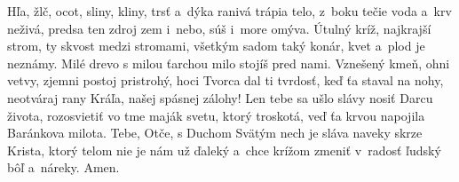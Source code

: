 Hľa, žlč, ocot, sliny, kliny,
trsť a~dýka ranivá
trápia telo, z~boku tečie
voda a~krv neživá,
predsa ten zdroj zem i~nebo,
súš i~more omýva.
\versseparator
Útulný kríž, najkrajší strom,
ty skvost medzi stromami,
všetkým sadom taký konár,
kvet a~plod je neznámy.
Milé drevo s milou ťarchou
milo stojíš pred nami.
\versseparator
Vznešený kmeň, ohni vetvy,
zjemni postoj pristrohý,
hoci Tvorca dal ti tvrdosť,
keď ťa staval na nohy,
neotváraj rany Kráľa,
našej spásnej zálohy!
\versseparator
Len tebe sa ušlo slávy
nosiť Darcu života,
rozosvietiť vo tme maják
svetu, ktorý troskotá,
veď ťa krvou napojila
Baránkova milota.
\versseparator
Tebe, Otče, s Duchom Svätým
nech je sláva naveky
skrze Krista, ktorý telom
nie je nám už ďaleký
a~chce krížom zmeniť v~radosť
ľudský bôľ a~náreky. Amen.